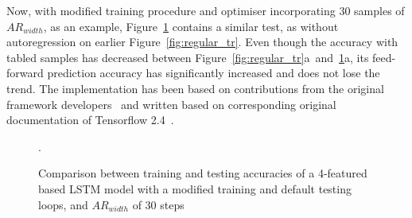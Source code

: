 %
%
Now, with modified training procedure and optimiser incorporating 30 samples of $AR_{width}$, as an example, \mbox{Figure~\ref{fig:modefied_tr}} contains a similar test, as without autoregression on earlier Figure~\ref{fig:regular_tr}.
Even though the accuracy with tabled samples has decreased between \mbox{Figure~\ref{fig:regular_tr}a and~\ref{fig:modefied_tr}a}, its feed-forward prediction accuracy has significantly increased and does not lose the trend.
The implementation has been based on contributions from the original framework developers~\cite{time_2020} and written based on corresponding original documentation of Tensorflow 2.4~\cite{tensorflow2015-whitepaper}.
 {
\begin{figure}[!t]
    \centering
    \vspace{-3ex}
    \label{subfig:modefied_tr}
    \label{subfig:modefied_ts}
    \caption{Comparison between training and testing accuracies of a 4-featured based LSTM model with a modified training and default testing loops, and $AR_{width}$ of 30 steps}.
    \label{fig:modefied_tr}
\end{figure}
}
